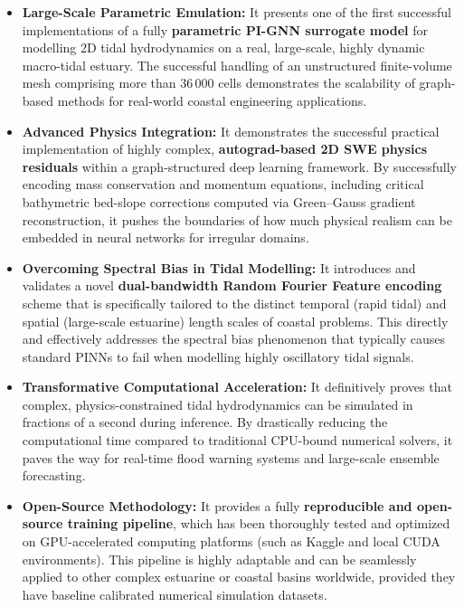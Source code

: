 \begin{itemize}
    \item \textbf{Large-Scale Parametric Emulation:} It presents one of the first successful implementations of a fully \textbf{parametric PI-GNN
    surrogate model} for modelling 2D tidal hydrodynamics on a real, large-scale,
    highly dynamic macro-tidal estuary. The successful handling of an unstructured finite-volume mesh comprising
    more than 36\,000 cells demonstrates the scalability of graph-based methods for real-world coastal engineering applications.

    \item \textbf{Advanced Physics Integration:} It demonstrates the successful practical implementation of highly complex,
    \textbf{autograd-based 2D SWE physics residuals} within a graph-structured deep learning framework. By successfully encoding mass
    conservation and momentum equations, including critical bathymetric bed-slope
    corrections computed via Green--Gauss gradient reconstruction, it pushes the boundaries of how much physical realism can be embedded in neural networks for irregular domains.

    \item \textbf{Overcoming Spectral Bias in Tidal Modelling:} It introduces and validates a novel \textbf{dual-bandwidth Random Fourier Feature
    encoding} scheme that is specifically tailored to the distinct temporal (rapid tidal) and
    spatial (large-scale estuarine) length scales of coastal problems. This directly and effectively addresses
    the spectral bias phenomenon that typically causes standard PINNs to fail when modelling highly oscillatory tidal signals.

    \item \textbf{Transformative Computational Acceleration:} It definitively proves that complex, physics-constrained tidal hydrodynamics can be simulated in fractions of a second during inference. By drastically reducing the computational time compared to traditional CPU-bound numerical solvers, it paves the way for real-time flood warning systems and large-scale ensemble forecasting.

    \item \textbf{Open-Source Methodology:} It provides a fully \textbf{reproducible and open-source training pipeline}, which has been thoroughly tested and optimized on GPU-accelerated computing platforms (such as Kaggle and local CUDA environments). This pipeline is highly adaptable and can be seamlessly applied to other complex estuarine or coastal basins worldwide, provided they have baseline calibrated numerical simulation datasets.
\end{itemize}

